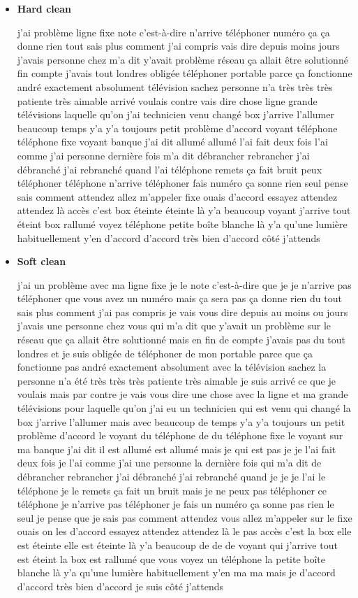 \begin{itemize}
    \item \textbf{Hard clean}
    
    j'ai problème ligne fixe note c'est-à-dire n'arrive téléphoner numéro ça ça donne rien tout sais plus comment j'ai compris vais dire depuis moins jours j'avais personne chez m'a dit y'avait problème réseau ça allait être solutionné fin compte j'avais tout londres obligée téléphoner portable parce ça fonctionne andré exactement absolument télévision sachez personne n'a très très très patiente très aimable arrivé voulais contre vais dire chose ligne grande télévisions laquelle qu'on j'ai technicien venu changé box j'arrive l'allumer beaucoup temps y'a y'a toujours petit problème d'accord voyant téléphone téléphone fixe voyant banque j'ai dit allumé allumé l'ai fait deux fois l'ai comme j'ai personne dernière fois m'a dit débrancher rebrancher j'ai débranché j'ai rebranché quand l'ai téléphone remets ça fait bruit peux téléphoner téléphone n'arrive téléphoner fais numéro ça sonne rien seul pense sais comment attendez allez m'appeler fixe ouais d'accord essayez attendez attendez là accès c'est box éteinte éteinte là y'a beaucoup voyant j'arrive tout éteint box rallumé voyez téléphone petite boîte blanche là y'a qu'une lumière habituellement y'en d'accord d'accord très bien d'accord côté j'attends

    \item \textbf{Soft clean}
    
    j'ai un problème avec ma ligne fixe je le note c'est-à-dire que je je n'arrive pas téléphoner que vous avez un numéro mais ça sera pas ça donne rien du tout sais plus comment j'ai pas compris je vais vous dire depuis au moins ou jours j'avais une personne chez vous qui m'a dit que y'avait un problème sur le réseau que ça allait être solutionné mais en fin de compte j'avais pas du tout londres et je suis obligée de téléphoner de mon portable parce que ça fonctionne pas andré exactement absolument avec la télévision sachez la personne n'a été très très très patiente très aimable je suis arrivé ce que je voulais mais par contre je vais vous dire une chose avec la ligne et ma grande télévisions pour laquelle qu'on j'ai eu un technicien qui est venu qui changé la box j'arrive l'allumer mais avec beaucoup de temps y'a y'a toujours un petit problème d'accord le voyant du téléphone de du téléphone fixe le voyant sur ma banque j'ai dit il est allumé est allumé mais je qui est pas je je l'ai fait deux fois je l'ai comme j'ai une personne la dernière fois qui m'a dit de débrancher rebrancher j'ai débranché j'ai rebranché quand je je je l'ai le téléphone je le remets ça fait un bruit mais je ne peux pas téléphoner ce téléphone je n'arrive pas téléphoner je fais un numéro ça sonne pas rien le seul je pense que je sais pas comment attendez vous allez m'appeler sur le fixe ouais on les d'accord essayez attendez attendez là le pas accès c'est la box elle est éteinte elle est éteinte là y'a beaucoup de de de voyant qui j'arrive tout est éteint la box est rallumé que vous voyez un téléphone la petite boîte blanche là y'a qu'une lumière habituellement y'en ma ma mais je d'accord d'accord très bien d'accord je suis côté j'attends
\end{itemize}